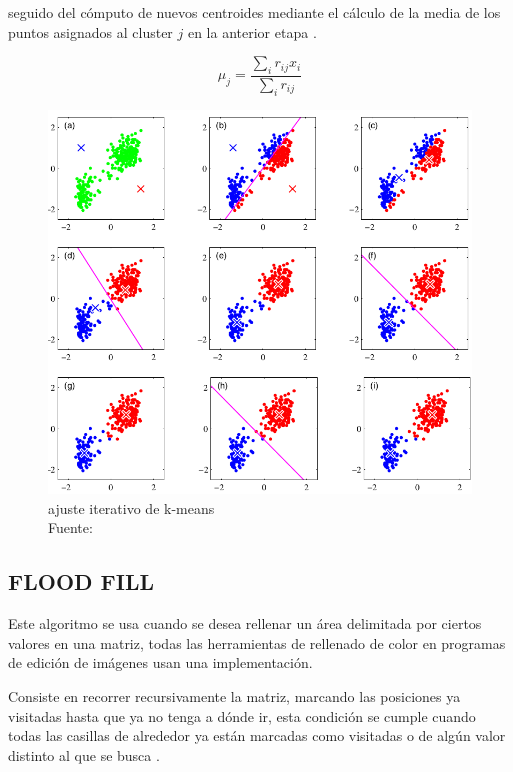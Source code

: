         	seguido del cómputo de nuevos centroides mediante el cálculo de la media de los puntos asignados al cluster $j$ en la anterior etapa \citep{bishop}.
        	
        	\begin{equation}
        		\mu_j = \frac{\sum_{i}r_{ij}x_i}{\sum_{i}r_{ij}}
        	\end{equation}
        
        	\begin{figure}[H]
        		\centering
        		\includegraphics[scale=0.5]{imagenes/kmeans}
        		\caption[Ajuste iterativo de k-means]{ajuste iterativo de k-means\\Fuente: \citep{bishop}}
        	\end{figure}
        \subsection{FLOOD FILL}
        	Este algoritmo se usa cuando se desea rellenar un área delimitada por ciertos valores en una matriz, todas las herramientas de rellenado de color en programas de edición de imágenes usan una implementación.
        	
        	Consiste en recorrer recursivamente la matriz, marcando las posiciones ya visitadas hasta que ya no tenga a dónde ir, esta condición se cumple cuando todas las casillas de alrededor ya están marcadas como visitadas o de algún valor distinto al que se busca \citep{halim2013competitive}.\\
        	
